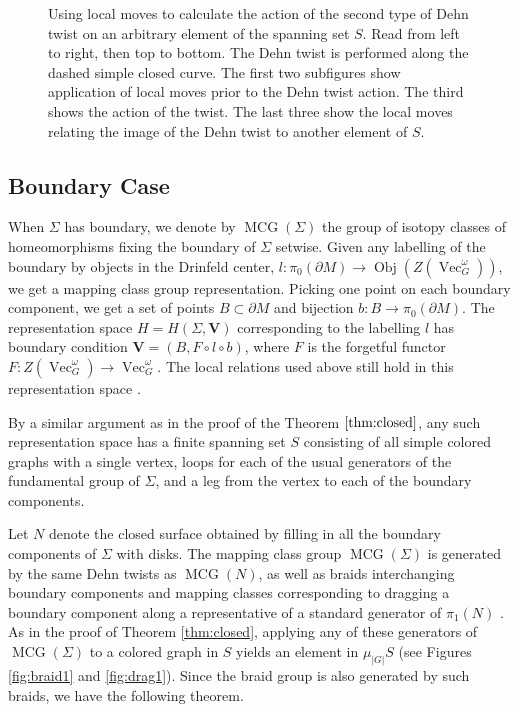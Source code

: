 \documentclass{amsart}
\newcommand{\Hs}{H}
\DeclareMathOperator{\MCG}{MCG}
\DeclareMathOperator{\Vect}{Vec}
\DeclareMathOperator{\Obj}{Obj}
\newcommand{\VV}{\mathbf{V}}       %
\newcommand{\vgo}{\Vect_G^\omega}
\newcommand{\Si}{\Sigma}
\begin{document}
\begin{figure}
\caption{Using local moves to calculate the action of the second type of Dehn twist on an arbitrary element of the spanning set $S$. Read from left to right, then top to bottom.   The Dehn twist is performed along the dashed simple closed curve.  The first two subfigures show application of local moves prior to the Dehn twist action. The third shows the action of the twist.  The last three show the local moves relating the image of the Dehn twist to another element of $S$.}
\label{fig:tikzTwist2_0}
\end{figure}


\subsection{Boundary Case}

When $\Si$ has boundary, we denote by $\MCG(\Si)$ the group of isotopy classes of homeomorphisms fixing the boundary of $\Si$ setwise. Given any labelling of the boundary  by objects in the Drinfeld center, $l : \pi_0(\partial M) \to \Obj(Z(\vgo))$, we get a mapping class group representation. Picking one point on each boundary component, we get a set of points $B \subset \partial M$ and bijection $b: B \to \pi_0(\partial M)$.  The representation space $H = \Hs(\Si, \VV)$ corresponding to the labelling $l$ has boundary condition $\VV = (B, F \circ l \circ b)$, where $F$ is the forgetful functor $F: Z(\vgo) \to \vgo$.  The local relations used above still hold in this representation space \cite{kirillovStringNets}.

By a similar argument as in the proof of the Theorem $\ref{thm:closed}$, any such representation space has a finite spanning set $S$ consisting of all simple colored graphs with a single vertex, loops for each of the usual generators of the fundamental group of $\Si$, and a leg from the vertex to each of the boundary components.  

Let $N$ denote the closed surface obtained by filling in all the boundary components of $\Si$ with disks. The mapping class group $\MCG(\Si)$ is generated by the same Dehn twists as $\MCG(N)$, as well as braids interchanging boundary components and mapping classes corresponding to dragging a boundary component along a representative of a standard generator of $\pi_1(N)$ \cite{birman}.  As in the proof of Theorem \ref{thm:closed}, applying any of these generators of $\MCG(\Si)$ to a colored graph in $S$ yields an element in $\mu_{|G|}S$ (see Figures \ref{fig:braid1} and \ref{fig:drag1}).  Since the braid group is also generated by such braids, we have the following theorem.
\end{document}
